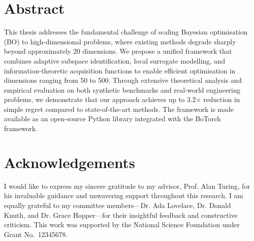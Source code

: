 \documentclass[
    doctype=thesis,
    language=english,
    institution=none,
    titlestyle=thesis,
    twoside,
    BCOR=5mm,
]{../../omnilatex}
\begin{document}
\frontmatter

\maketitle

\section*{Abstract}
This thesis addresses the fundamental challenge of scaling Bayesian optimisation
(BO) to high-dimensional problems, where existing methods degrade sharply beyond
approximately 20 dimensions.  We propose a unified framework that combines
adaptive subspace identification, local surrogate modelling, and
information-theoretic acquisition functions to enable efficient optimisation in
dimensions ranging from 50 to 500.  Through extensive theoretical analysis and
empirical evaluation on both synthetic benchmarks and real-world engineering
problems, we demonstrate that our approach achieves up to 3.2$\times$ reduction
in simple regret compared to state-of-the-art methods.  The framework is made
available as an open-source Python library integrated with the BoTorch framework.

\section*{Acknowledgements}
I would like to express my sincere gratitude to my advisor, Prof. Alan Turing,
for his invaluable guidance and unwavering support throughout this research.  I am
equally grateful to my committee members---Dr. Ada Lovelace, Dr. Donald Knuth,
and Dr. Grace Hopper---for their insightful feedback and constructive criticism.
This work was supported by the National Science Foundation under Grant
No.\ 12345678.

\tableofcontents
\listoffigures
\listoftables

\printglossary[type=\acronymtype,title=List of Abbreviations]
\printglossary[title=Glossary]

\mainmatter








\backmatter

\printbibliography

\appendix


\printindex
\end{document}
